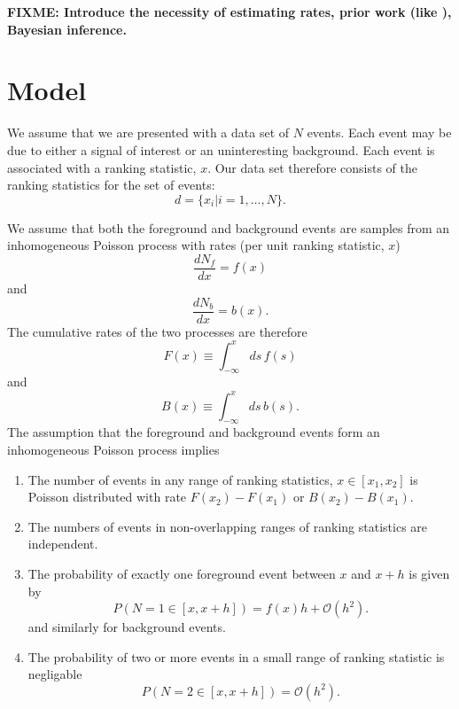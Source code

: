 \documentclass[aps,prd,reprint]{revtex4-1}
\newcommand{\order}[1]{\mathcal{O}\left( #1 \right)}
\newcommand{\fixme}[1]{\textbf{FIXME: #1}}
\begin{document}
\fixme{Introduce the necessity of estimating rates, prior work (like
  \cite{Biswas2009}), Bayesian inference.}

\section{Model}

We assume that we are presented with a data set of $N$ events.  Each
event may be due to either a signal of interest or an uninteresting
background.  Each event is associated with a ranking statistic, $x$.
Our data set therefore consists of the ranking statistics for the set
of events:
\begin{equation}
  d = \{ x_i | i = 1, \ldots, N \}.
\end{equation}

We assume that both the foreground and background events are samples
from an inhomogeneous Poisson process with rates (per unit ranking
statistic, $x$)
\begin{equation}
  \frac{dN_f}{dx} = f(x)
\end{equation}
and 
\begin{equation}
  \frac{dN_b}{dx} = b(x).
\end{equation}
The cumulative rates of the two processes are therefore
\begin{equation}
  F(x) \equiv \int_{-\infty}^x ds\, f(s)
\end{equation}
and
\begin{equation}
  B(x) \equiv \int_{-\infty}^x ds\, b(s).
\end{equation}
The assumption that the foreground and background events form an
inhomogeneous Poisson process implies
\begin{enumerate}
\item The number of events in any range of ranking statistics, $x \in
  [x_1, x_2]$ is Poisson distributed with rate $F(x_2) - F(x_1)$ or
  $B(x_2) - B(x_1)$.
\item The numbers of events in non-overlapping ranges of ranking
  statistics are independent. 
\item The probability of exactly one foreground event between $x$ and
  $x+h$ is given by
  \begin{equation}
    P(N = 1 \in [x, x+h]) = f(x) h + \order{h^2}.
  \end{equation}
  and similarly for background events.
\item The probability of two or more events in a small range of
  ranking statistic is negligable
  \begin{equation}
    P(N = 2 \in [x, x+h]) = \order{h^2}.
  \end{equation}
\end{enumerate}
\end{document}
